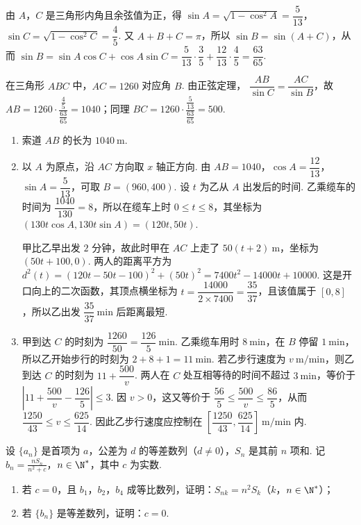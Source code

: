\begin{solution}
由 \(A\)，\(C\) 是三角形内角且余弦值为正，得
\(\sin A=\sqrt{1-\cos^2A}=\dfrac5{13}\)，\(\sin C=\sqrt{1-\cos^2C}=\dfrac45\). 又 \(A+B+C=\pi\)，所以 \(\sin B=\sin(A+C)\)，从而
\(\sin B=\sin A\cos C+\cos A\sin C=\dfrac5{13}\cdot\dfrac35+\dfrac{12}{13}\cdot\dfrac45=\dfrac{63}{65}\).

在三角形 \(ABC\) 中，\(AC=1260\) 对应角 \(B\). 由正弦定理，
\(\dfrac{AB}{\sin C}=\dfrac{AC}{\sin B}\)，故 \(AB=1260\cdot\dfrac{\frac{4}{5}}{\frac{63}{65}}=1040\)；同理
\(BC=1260\cdot\dfrac{\frac{5}{13}}{\frac{63}{65}}=500\).

\begin{enumerate}
\item 索道 \(AB\) 的长为 \(1040\mathrm{~m}\).
\item 以 \(A\) 为原点，沿 \(AC\) 方向取 \(x\) 轴正方向. 由 \(AB=1040\)，\(\cos A=\dfrac{12}{13}\)，\(\sin A=\dfrac5{13}\)，可取 \(B=(960,400)\). 设 \(t\) 为乙从 \(A\) 出发后的时间. 乙乘缆车的时间为 \(\dfrac{1040}{130}=8\)，所以在缆车上时 \(0\leqslant t\leqslant8\)，其坐标为 \((130t\cos A,130t\sin A)=(120t,50t)\).

甲比乙早出发 \(2\) 分钟，故此时甲在 \(AC\) 上走了 \(50(t+2)\mathrm{~m}\)，坐标为 \((50t+100,0)\). 两人的距离平方为
\(d^2(t)=(120t-50t-100)^2+(50t)^2=7400t^2-14000t+10000\). 这是开口向上的二次函数，其顶点横坐标为 \(t=\dfrac{14000}{2\times7400}=\dfrac{35}{37}\)，且该值属于 \([0,8]\)，所以乙出发 \(\dfrac{35}{37}\mathrm{~min}\) 后距离最短.
\item 甲到达 \(C\) 的时刻为 \(\dfrac{1260}{50}=\dfrac{126}{5}\mathrm{~min}\). 乙乘缆车用时 \(8\mathrm{~min}\)，在 \(B\) 停留 \(1\mathrm{~min}\)，所以乙开始步行的时刻为 \(2+8+1=11\mathrm{~min}\). 若乙步行速度为 \(v\mathrm{~m/min}\)，则乙到达 \(C\) 的时刻为 \(11+\dfrac{500}{v}\). 两人在 \(C\) 处互相等待的时间不超过 \(3\mathrm{~min}\)，等价于
\(\left|11+\dfrac{500}{v}-\dfrac{126}{5}\right|\leqslant3\).
因 \(v>0\)，这又等价于 \(\dfrac{56}{5}\leqslant\dfrac{500}{v}\leqslant\dfrac{86}{5}\)，从而
\(\dfrac{1250}{43}\leqslant v\leqslant\dfrac{625}{14}\). 因此乙步行速度应控制在 \(\left[\dfrac{1250}{43},\dfrac{625}{14}\right]\mathrm{~m/min}\) 内.
\end{enumerate}
\end{solution}

\begin{problem}
设 \(\{a_n\}\) 是首项为 \(a\)，公差为 \(d\) 的等差数列（\(d\ne 0\)），\(S_n\) 是其前 \(n\) 项和. 记 \(b_n=\frac{nS_n}{n^2+c}\)，\(n\in\N^*\)，其中 \(c\) 为实数.

\begin{enumerate}
\item 若 \(c=0\)，且 \(b_1\)，\(b_2\)，\(b_4\) 成等比数列，证明：\(S_{nk}=n^2S_k\)（\(k\)，\(n\in\N^*\)）；
\item 若 \(\{b_n\}\) 是等差数列，证明：\(c=0\).
\end{enumerate}
\end{problem}

